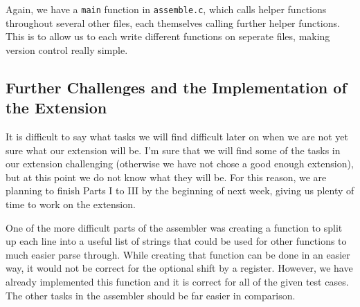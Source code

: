 \documentclass[10pt]{article}
\begin{document}
Again, we have a \texttt{main} function in \texttt{assemble.c}, which calls helper functions throughout several other files, each themselves calling further helper functions. This is to allow us to each write different functions on seperate files, making version control really simple.

\subsection{Further Challenges and the Implementation of the Extension}

It is difficult to say what tasks we will find difficult later on when we are not yet sure what our extension will be. I'm sure that we will find some of the tasks in our extension challenging (otherwise we have not chose a good enough extension), but at this point we do not know what they will be. For this reason, we are planning to finish Parts I to III by the beginning of next week, giving us plenty of time to work on the extension.

One of the more difficult parts of the assembler was creating a function to split up each line into a useful list of strings that could be used for other functions to much easier parse through. While creating that function can be done in an easier way, it would not be correct for the optional shift by a register. However, we have already implemented this function and it is correct for all of the given test cases. The other tasks in the assembler should be far easier in comparison.
\end{document}
